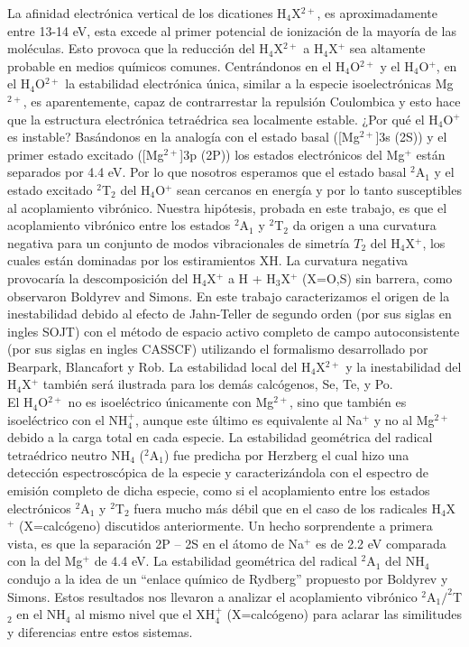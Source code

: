 \documentclass[12pt]{report}
\begin{document}
La afinidad electrónica vertical de los dicationes H$_4$X$^{2+}$, es aproximadamente entre 13-14 eV, esta excede al primer potencial de ionización de la mayoría de las moléculas.  Esto provoca que la reducción del H$_4$X$^{2+}$ a H$_4$X$^+$ sea altamente probable en medios químicos comunes.  Centrándonos en el H$_4$O$^{2+}$ y el H$_4$O$^+$, en el H$_4$O$^{2+}$ la estabilidad electrónica única, similar a la especie isoelectrónicas Mg$^{2+}$, es aparentemente, capaz de contrarrestar la repulsión Coulombica y esto hace que la estructura electrónica tetraédrica sea localmente estable. ¿Por qué el H$_4$O$^+$ es instable? Basándonos en la analogía con el estado basal ([Mg$^{2+}$]3s (2S)) y el primer estado excitado ([Mg$^{2+}$]3p (2P)) los estados electrónicos del Mg$^+$ están separados por 4.4 eV. Por lo que nosotros esperamos que el estado basal $^2$A$_1$ y el estado excitado $^2$T$_2$ del H$_4$O$^+$ sean cercanos en energía y por lo tanto susceptibles al acoplamiento vibrónico. Nuestra hipótesis, probada en este trabajo, es que el acoplamiento vibrónico entre los estados $^2$A$_1$ y $^2$T$_2$  da origen a una curvatura negativa para un conjunto de modos vibracionales de simetría $T_2$ del H$_4$X$^+$, los cuales están dominadas por los estiramientos XH. La curvatura negativa provocaría la descomposición del H$_4$X$^+$ a H + H$_3$X$^+$ (X=O,S) sin barrera, como observaron Boldyrev and Simons. En este trabajo caracterizamos el origen de la inestabilidad debido al efecto de Jahn-Teller de segundo orden (por sus siglas en ingles SOJT) con el método de espacio activo completo de campo autoconsistente (por sus siglas en ingles CASSCF) utilizando el formalismo desarrollado por Bearpark, Blancafort y Rob\cite{Bearpark2002}. La estabilidad local del H$_4$X$^{2+}$ y la inestabilidad del H$_4$X$^+$ también será ilustrada para los demás calcógenos, Se, Te, y Po.  
\\


El H$_4$O$^{2+}$ no es isoeléctrico únicamente con Mg$^{2+}$, sino que también es isoeléctrico con el NH$_4^+$, aunque este último es equivalente al Na$^+$ y no al Mg$^{2+}$ debido a la carga total en cada especie. La estabilidad geométrica del radical tetraédrico neutro NH$_4$ ($^2$A$_1$) fue predicha por Herzberg\cite{Herzberg1984} el cual hizo una detección espectroscópica  de la especie y caracterizándola con el espectro de emisión completo de dicha especie, como si el acoplamiento entre los estados electrónicos $^2$A$_1$ y $^2$T$_2$ fuera mucho más débil que en el caso de los radicales H$_4$X$^+$ (X=calcógeno) discutidos anteriormente. Un hecho sorprendente a primera vista, es que la separación 2P – 2S en el átomo de Na$^+$ es de 2.2 eV comparada con la del Mg$^+$ de 4.4 eV. La estabilidad geométrica del radical $^2$A$_1$ del NH$_4$ condujo a la idea de un “enlace químico de Rydberg” propuesto por Boldyrev y Simons\cite{Boldyrev2002}. Estos resultados nos llevaron a analizar el acoplamiento vibrónico $^2$A$_1/^2$T$_2$ en el NH$_4$ al mismo nivel que el XH$_4^+$ (X=calcógeno) para aclarar las similitudes y diferencias entre estos sistemas.
\\
\end{document}
